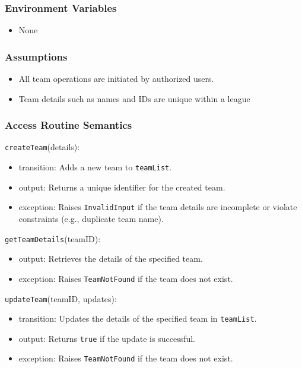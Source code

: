 \documentclass[12pt, titlepage]{article}
\begin{document}
\subsubsection{Environment Variables}
\begin{itemize}
    \item None
\end{itemize}

\subsubsection{Assumptions}
\begin{itemize}
    \item All team operations are initiated by authorized users.
    \item Team details such as names and IDs are unique within a league
\end{itemize}

\subsubsection{Access Routine Semantics}

\noindent \texttt{createTeam}(details):  
\begin{itemize}
    \item transition: Adds a new team to \texttt{teamList}.
    \item output: Returns a unique identifier for the created team.
    \item exception: Raises \texttt{InvalidInput} if the team details are incomplete or violate constraints (e.g., duplicate team name).
\end{itemize}

\noindent \texttt{getTeamDetails}(teamID):  
\begin{itemize}
    \item output: Retrieves the details of the specified team.
    \item exception: Raises \texttt{TeamNotFound} if the team does not exist.
\end{itemize}

\noindent \texttt{updateTeam}(teamID, updates):  
\begin{itemize}
    \item transition: Updates the details of the specified team in \texttt{teamList}.
    \item output: Returns \texttt{true} if the update is successful.
    \item exception: Raises \texttt{TeamNotFound} if the team does not exist.
\end{itemize}
\end{document}
